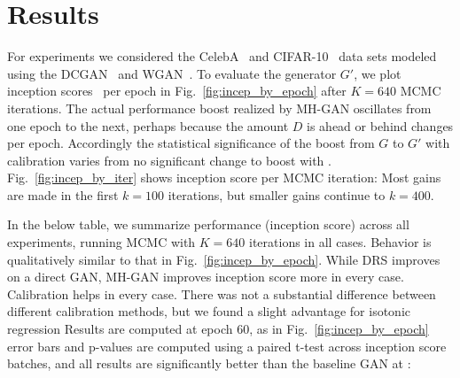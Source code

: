 \documentclass{article}
\begin{document}
\section{Results}
\label{sec:Results}

For experiments we considered the CelebA~\citep{Liu2015} and CIFAR-10~\citep{Torralba2008} data sets modeled using the DCGAN~\citep{Radford2015} and WGAN~\citep{Arjovsky2017}.
To evaluate the generator $G'$, we plot inception scores~\citep{Salimans2016} per epoch in Fig.~\ref{fig:incep_by_epoch} after $K=640$ MCMC iterations.
The actual performance boost realized by MH-GAN oscillates from one epoch to the next, perhaps because the amount $D$ is ahead or behind changes per epoch.
Accordingly the statistical significance of the boost from $G$ to $G'$ with calibration varies from no significant change to boost with .
Fig.~\ref{fig:incep_by_iter} shows inception score per MCMC iteration:
Most gains are made in the first $k=100$ iterations, but smaller gains continue to $k=400$.

In the below table, we summarize performance (inception score) across all experiments, running MCMC with $K=640$ iterations in all cases.
Behavior is qualitatively similar to that in Fig.~\ref{fig:incep_by_epoch}.
While DRS improves on a direct GAN, MH-GAN improves inception score more in every case.
Calibration helps in every case.
There was not a substantial difference between different calibration methods, but we found a slight advantage for isotonic regression
Results are computed at epoch 60, as in Fig.~\ref{fig:incep_by_epoch} error bars and p-values are computed using a paired t-test across inception score batches, and all results are significantly better than the baseline GAN at :
\end{document}
